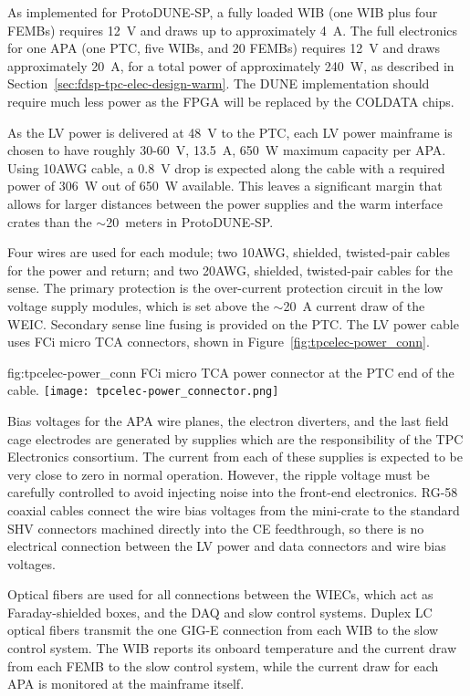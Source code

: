 As implemented for ProtoDUNE-SP, a fully loaded WIB (one WIB plus four FEMBs) requires
12~V and draws up to approximately 4~A. The full electronics for one APA (one PTC, five WIBs, and 20 FEMBs) 
requires 12~V and draws approximately 20~A, for a total power of approximately 240~W, as 
described in Section~\ref{sec:fdsp-tpc-elec-design-warm}. The DUNE implementation should require much 
less power as the FPGA will be replaced by the COLDATA chips.

As the LV power is delivered at 48~V to the PTC, each LV power mainframe is chosen to have 
roughly 30-60~V, 13.5~A, 650~W maximum capacity per APA. Using 10AWG cable, a 0.8~V drop is 
expected along the cable with a required power of 306~W out of 650~W available.  
This leaves a significant margin that allows for larger distances between the power supplies and 
the warm interface crates than the $\sim$20~meters in ProtoDUNE-SP.

Four wires are used for each module; two 10AWG, shielded, twisted-pair cables for the power and return; and two 20AWG, shielded, twisted-pair cables for the sense.
The primary protection is the over-current protection circuit in the low voltage supply modules, 
which is set above the $\sim$20~A current draw of the WEIC.  Secondary sense line fusing is 
provided on the PTC.  The LV power cable uses FCi micro TCA connectors, shown in
Figure~\ref{fig:tpcelec-power_conn}.

\begin{dunefigure}
{fig:tpcelec-power_conn}
{FCi micro TCA power connector at the PTC end of the cable.}
\texttt{[image: tpcelec-power\_connector.png]}
\end{dunefigure}

Bias voltages for the APA wire planes, the electron diverters, and the last field cage electrodes are generated by supplies which are the responsibility of the TPC Electronics consortium.  The current from each of these supplies is expected to be very close to zero in normal operation.  However, the ripple voltage must be carefully controlled to avoid injecting noise into the front-end electronics.  RG-58 coaxial cables connect the wire bias voltages from the mini-crate to the standard SHV
connectors machined directly into the CE feedthrough, so there is no electrical connection between 
the LV power and data connectors and wire bias voltages.

Optical fibers are used for all connections between the WIECs, which act as
Faraday-shielded boxes, and the DAQ and slow control systems.  Duplex LC optical fibers
transmit the one GIG-E connection from each WIB to the slow control system.  The WIB reports
its onboard temperature and the current draw from each FEMB to the slow control system, while the
current draw for each APA is monitored at the mainframe itself.
